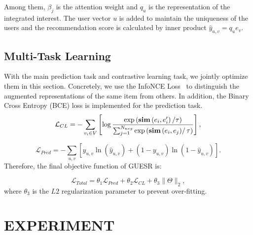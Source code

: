 \documentclass[runningheads]{llncs}
\begin{document}
Among them, \(\beta_j\) is the attention weight and \(q_u\) is the representation of the integrated interest. The user vector \(u\) is added to maintain the uniqueness of the users and the recommendation score is calculated by inner product $\hat{y}_{u, v}={q}_{u} {e}_{v}$. 

\vspace{-10pt}

\subsection{Multi-Task Learning}

With the main prediction task and contrastive learning task, we jointly optimize them in this section. Concretely, we use the InfoNCE Loss~\cite{infonceloss} to distinguish the augmented representations of the same item from others. In addition, the Binary Cross Entropy (BCE) loss is implemented for the prediction task. 
\begin{equation}
\mathcal{L}_{CL}=-\sum_{v_{i} \in V}\left[\log \frac{\exp \left(\mathbf{sim}\left(e_i, e^{\prime}_{i}\right) /\tau\right)  }{ \sum_{j=1}^{N_{neg}} \exp \left(\mathbf{sim}\left(e_i, e_{j}\right)\right/\tau) }\right],
\end{equation}

\vspace{-10pt}

\begin{equation}
\mathcal{L}_{Pred}=-\sum_{u, v}\left[y_{u, v} \ln \left(\hat{y}_{u, v}\right)+\left(1-y_{u, v}\right) \ln \left(1-\hat{y}_{u, v}\right)\right].
\end{equation}
\vspace{-5pt}
Therefore, the final objective function of GUESR is:

\begin{equation}
\mathcal{L}_{Total}=\theta_{1}\mathcal{L}_{Pred}+\theta_{2} \mathcal{L}_{CL} + \theta_{3}\|\Theta\|_{2},
\end{equation}
where \(\theta_3\) is the \(L2 \) regularization parameter to prevent over-fitting. 



\vspace{-10pt}
\section{EXPERIMENT}
\vspace{-5pt}
\end{document}
